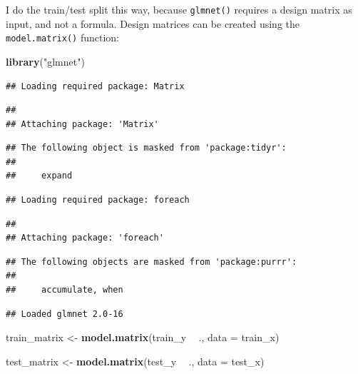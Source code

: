 \documentclass[]{gitbook}
\newenvironment{Shaded}{\begin{snugshade}}{\end{snugshade}}
\newcommand{\DataTypeTok}[1]{\textcolor[rgb]{0.13,0.29,0.53}{#1}}
\newcommand{\KeywordTok}[1]{\textcolor[rgb]{0.13,0.29,0.53}{\textbf{#1}}}
\newcommand{\NormalTok}[1]{#1}
\newcommand{\OperatorTok}[1]{\textcolor[rgb]{0.81,0.36,0.00}{\textbf{#1}}}
\newcommand{\StringTok}[1]{\textcolor[rgb]{0.31,0.60,0.02}{#1}}
\begin{document}
I do the train/test split this way, because \texttt{glmnet()} requires a design matrix as input, and not
a formula. Design matrices can be created using the \texttt{model.matrix()} function:

\begin{Shaded}
\begin{Highlighting}[]
\KeywordTok{library}\NormalTok{(}\StringTok{"glmnet"}\NormalTok{)}
\end{Highlighting}
\end{Shaded}

\begin{verbatim}
## Loading required package: Matrix
\end{verbatim}

\begin{verbatim}
## 
## Attaching package: 'Matrix'
\end{verbatim}

\begin{verbatim}
## The following object is masked from 'package:tidyr':
## 
##     expand
\end{verbatim}

\begin{verbatim}
## Loading required package: foreach
\end{verbatim}

\begin{verbatim}
## 
## Attaching package: 'foreach'
\end{verbatim}

\begin{verbatim}
## The following objects are masked from 'package:purrr':
## 
##     accumulate, when
\end{verbatim}

\begin{verbatim}
## Loaded glmnet 2.0-16
\end{verbatim}

\begin{Shaded}
\begin{Highlighting}[]
\NormalTok{train_matrix <-}\StringTok{ }\KeywordTok{model.matrix}\NormalTok{(train_y }\OperatorTok{~}\StringTok{ }\NormalTok{., }\DataTypeTok{data =}\NormalTok{ train_x)}

\NormalTok{test_matrix <-}\StringTok{ }\KeywordTok{model.matrix}\NormalTok{(test_y }\OperatorTok{~}\StringTok{ }\NormalTok{., }\DataTypeTok{data =}\NormalTok{ test_x)}
\end{Highlighting}
\end{Shaded}
\end{document}
